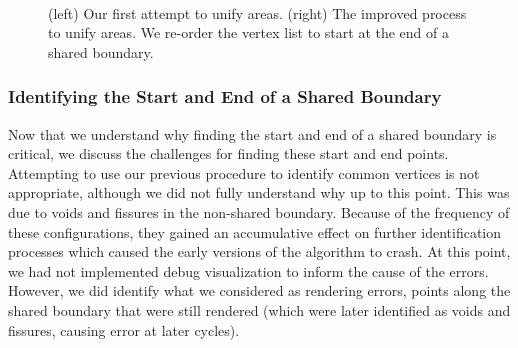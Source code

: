 \begin{figure}[t]
~~ 
\caption{(left) Our first attempt to unify areas. (right) The improved process to unify areas. We re-order the vertex list to start at the end of a shared boundary.} 
\end{figure}


\subsubsection{Identifying the Start and End of a Shared Boundary}
Now that we understand why finding the start and end of a shared boundary is critical, we discuss the challenges for finding these start and end points. Attempting to use our previous procedure to identify common vertices is not appropriate, although we did not fully understand why up to this point. This was due to voids and fissures in the non-shared boundary. Because of the frequency of these configurations, they gained an accumulative effect on further identification processes which caused the early versions of the algorithm to crash. At this point, we had not implemented debug visualization to inform the cause of the errors. However, we did identify what we considered as rendering errors, points along the shared boundary that were still rendered (which were later identified as voids and fissures, causing error at later cycles).


